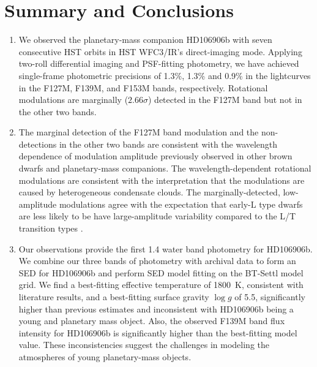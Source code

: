 \documentclass[twocolumn]{aastex62}
\newcommand{\logg}{\ensuremath{\log(g)}\xspace}
\begin{document}
\section{Summary and Conclusions}

\begin{enumerate}
\item We observed the planetary-mass companion HD106906b with seven consecutive HST orbits in HST WFC3/IR's direct-imaging mode. Applying two-roll differential imaging and PSF-fitting photometry, we have achieved single-frame photometric precisions of 1.3\%, 1.3\% and 0.9\% in the lightcurves in the F127M, F139M, and F153M bands, respectively. Rotational modulations are marginally ($2.66\sigma$) detected in the F127M band but not in the other two bands.

\item {The marginal detection of the F127M band modulation and the non-detections in the other two bands are consistent with the wavelength dependence of modulation amplitude previously observed in other brown dwarfs and planetary-mass companions.} The wavelength-dependent rotational modulations are consistent with the interpretation that the modulations are caused by heterogeneous condensate clouds. The marginally-detected, low-amplitude modulations agree with the expectation that early-L type dwarfs are less likely to be have large-amplitude variability compared to the L/T transition types \citep[e.g.][]{Radigan2014,Metchev2015}.

\item Our observations provide the first 1.4 \micron{} water band photometry for HD106906b. We combine our three bands of photometry with archival data to form an SED for HD106906b and perform SED model fitting on the BT-Settl model grid. We find a best-fitting effective temperature of 1800~K, consistent with literature results, and a best-fitting surface gravity $\log g$ of 5.5,  significantly higher than previous estimates and inconsistent with HD106906b being a young and planetary mass object. Also, the observed F139M band flux intensity for HD106906b is significantly higher than the best-fitting model value.
  These inconsistencies suggest the challenges in modeling the atmospheres of young planetary-mass objects.


\end{enumerate}
\end{document}
